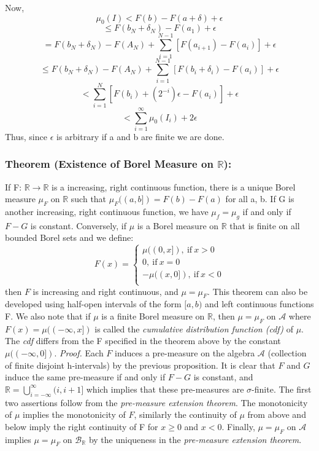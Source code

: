\documentclass{article}
\begin{document}
Now,
\[
\mu_0(I) < F(b) - F(a+\delta) +\epsilon
\]
\[
\leq F(b_N+\delta_N)-F(a_1) +\epsilon
\]
\[
=F(b_N+\delta_N)-F(A_N) + \sum_{i=1}^{N-1}[F(a_{i+1})-F(a_{i})] +\epsilon
\]
\[
\leq F(b_N+\delta_N)-F(A_N) + \sum_{i=1}^{N-1}[F(b_i+\delta_i)-F(a_{i})] +\epsilon
\]
\[
<\sum_{i=1}^N[F(b_i)+(2^{-i})\epsilon-F(a_i)] +\epsilon
\]
\[
<\sum_{i=1}^{\infty}\mu_0(I_i)
+2\epsilon
\]
Thus, since $\epsilon$ is arbitrary if a and b are finite we are done.

\subsubsection{Theorem (Existence of Borel Measure on $\mathbb{R}$):}
If F: $\mathbb{R}\to\mathbb{R}$ is a increasing, right continuous function, there is a unique Borel measure $\mu_F$ on $\mathbb{R}$ such that $\mu_F((a,b])=F(b) -F(a)$ for all a, b. If G is another increasing, right continuous function, we have $\mu_f=\mu_g$ if and only if $F - G$ is constant. Conversely, if $\mu$ is a Borel measure on $\mathbb{R}$ that is finite on all bounded Borel sets and we define:  
\[
F(x) =\begin{cases}
\mu((0,x]),\  \text{if}\ x>0 \\
0, \ \text{if}\ x=0\\
-\mu((x,0]), \ \text{if}\ x<0\\
    
\end{cases}
\]
then $F$ is increasing and right continuous, and $\mu = \mu_F.$\newline \newline
This theorem can also be developed using half-open intervals of the form $[a,b)$ and left continuous functions F. We also note that if $\mu$ is a finite Borel measure on $\mathbb{R}$, then $\mu =\mu_F$ on $\mathcal{A}$ where $F(x) = \mu((-\infty,x])$ is called the \emph{cumulative distribution function (cdf)} of $\mu$. The \emph{cdf} differs from the F specified in the theorem above by the constant $\mu((-\infty,0])$.  \newline \newline
\textit{Proof.}\newline \newline
Each $F$ induces a pre-measure  on the algebra $\mathcal{A}$ (collection of finite disjoint h-intervals) by the previous proposition. It is clear that $F$ and $G$ induce the same pre-measure if and only if $F-G$ is constant, and $\mathbb{R}=\bigcup_{i=-\infty}^{\infty}(i,i+1]$ which implies that these pre-measures are $\sigma$-finite. The first two assertions follow from the \emph{pre-measure extension theorem}. The monotonicity of $\mu$ implies the monotonicity of $F$, similarly the continuity of $\mu$ from above and below imply the right continuity of F for $x\geq0$ and $x<0$. Finally, $\mu=\mu_F$ on $\mathcal{A}$ implies $\mu =\mu_F$ on $\mathcal{B}_{\mathbb{R}} $ by the uniqueness in the \emph{pre-measure extension theorem}.
\end{document}
